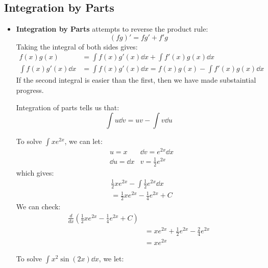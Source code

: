 \subsection{Integration by Parts}
\begin{itemize}
    \item \textbf{Integration by Parts} attempts to reverse the product rule:
    \begin{equation}
        (fg)' = fg' + f'g
    \end{equation}
    Taking the integral of both sides gives:
    \begin{align}
        f(x)g(x) &= \int f(x)g'(x) \dd{x} + \int f'(x) g(x) \dd{x} \\ 
        \int f(x)g'(x) \dd{x} &= \int f(x) g'(x) \dd{x} = f(x)g(x) - \int f'(x)g(x) \dd{x}
    \end{align}
    If the second integral is easier than the first, then we have made substaintial progress.
    \begin{idea}
        Integration of parts tells us that:
        \begin{equation}
            \int u \dd{v} = uv - \int v \dd{u}
        \end{equation}
    \end{idea}
    \begin{example}
        To solve $\int xe^{2x}$, we can let:
        \begin{align}
            &u=x            &\dd{v} = e^{2x} \dd{x} \\ 
            &\dd{u}=\dd{x} &v=\frac{1}{2}e^{2x} 
        \end{align}
        which gives:
        \begin{align}
            & \frac{1}{2}xe^{2x} - \int \frac{1}{2}e^{2x} \dd{x} \\ 
            &= \frac{1}{2}xe^{2x} - \frac{1}{4}e^{2x} + C
        \end{align}
        We can check:
        \begin{align}
            \frac{d}{dx}\left(\frac{1}{2}xe^{2x}-\frac{1}{4}e^{2x}+C\right) \\ 
            &= xe^{2x} + \frac{1}{2}e^{2x}-\frac{2}{4}e^{2x} \\ 
            &= xe^{2x}
        \end{align}
    \end{example}
    \begin{example}
        To solve $\int x^2\sin(2x) \dd{x}$, we let:
        \begin{align}

\end{align}
\end{example}
\end{itemize}
